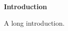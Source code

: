 \thispagestyle{empty}

\begin{center}
  \textbf{\Huge Introduction}
\end{center}


A long introduction.